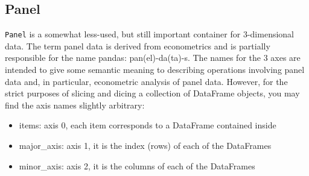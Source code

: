 \documentclass[KSmain.tex]{subfiles}
\begin{document}
\newpage
\subsection{Panel}


 
\texttt{Panel} is a somewhat less-used, but still important container for 3-dimensional data. 
The term panel data is derived from econometrics and is partially responsible for the name pandas: pan(el)-da(ta)-s. 
The names for the 3 axes are intended to give some semantic meaning to describing operations involving panel data and, 
in particular, econometric analysis of panel data. However, for the strict purposes of slicing and dicing a 
collection of DataFrame objects, you may find the axis names slightly arbitrary:
 
\begin{itemize}
\item items: axis 0, each item corresponds to a DataFrame contained inside
\item major\_axis: axis 1, it is the index (rows) of each of the DataFrames
\item minor\_axis: axis 2, it is the columns of each of the DataFrames
\end{itemize}

\newpage
\end{document}
